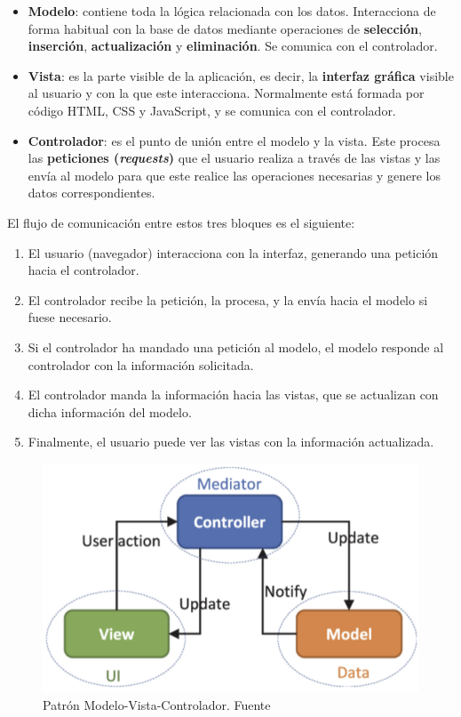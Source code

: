     \begin{itemize}
        \item \textbf{Modelo}: contiene toda la lógica relacionada con los datos.
        Interacciona de forma habitual con la base de datos mediante operaciones de
        \textbf{selección}, \textbf{inserción}, \textbf{actualización} y \textbf{eliminación}.
        Se comunica con el controlador.
        \item \textbf{Vista}: es la parte visible de la aplicación, es decir, la 
        \textbf{interfaz gráfica} visible al usuario y con la que este interacciona.
        Normalmente está formada por código HTML, CSS y JavaScript, y se comunica con el
        controlador.
        \item \textbf{Controlador}: es el punto de unión entre el modelo y la vista. Este
        procesa las \textbf{peticiones (\textit{requests})} que el usuario realiza a través
        de las vistas y las envía al modelo para que este realice las operaciones necesarias
        y genere los datos correspondientes.
    \end{itemize}

El flujo de comunicación entre estos tres bloques es el siguiente:

    \begin{enumerate}
        \item El usuario (navegador) interacciona con la interfaz, generando una petición
        hacia el controlador.
        \item El controlador recibe la petición, la procesa, y la envía hacia el modelo
        si fuese necesario.
        \item Si el controlador ha mandado una petición al modelo, el modelo responde al
        controlador con la información solicitada. 
        \item El controlador manda la información hacia las vistas, que se actualizan con
        dicha información del modelo.
        \item Finalmente, el usuario puede ver las vistas con la información actualizada.
    \end{enumerate}

    \begin{figure}[H]
        \centering
        \includegraphics[scale=0.50]{imagenes/mvc.png}
        \caption[Patrón Modelo-Vista-Controlador]{Patrón Modelo-Vista-Controlador. Fuente \cite{mvc}}
        \label{fig:mvc}
    \end{figure}

